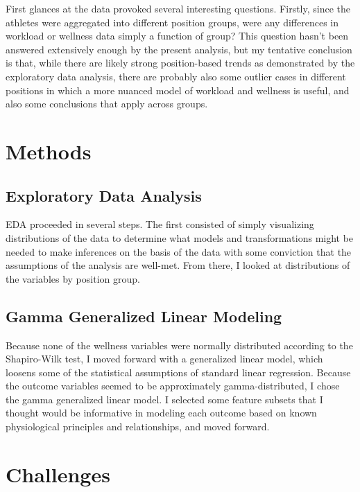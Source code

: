 \documentclass{article}
\begin{document}
		First glances at the data provoked several interesting questions. Firstly,
		since the athletes were aggregated into different position groups, were
		any differences in workload or wellness data simply a function of group?
		This question hasn't been answered extensively enough by the present
		analysis, but my tentative conclusion is that, while there are likely strong
		position-based trends as demonstrated by the exploratory data analysis,
		there are probably also some outlier cases in different positions in which
		a more nuanced model of workload and wellness is useful, and also some
		conclusions that apply across groups.

	\section{Methods}

		\subsection{Exploratory Data Analysis}

			EDA proceeded in several steps. The first consisted of simply visualizing
			distributions of the data to determine what models and transformations
			might be needed to make inferences on the basis of the data with some
			conviction that the assumptions of the analysis are well-met. From there,
			I looked at distributions of the variables by position group.

		\subsection{Gamma Generalized Linear Modeling}

			Because none of the wellness variables were normally distributed according
			to the Shapiro-Wilk test, I moved forward with a generalized linear model,
			which loosens some of the statistical assumptions of standard linear
			regression. Because the outcome variables seemed to be approximately
			gamma-distributed, I chose the gamma generalized linear model. I selected
			some feature subsets that I thought would be informative in modeling
			each outcome based on known physiological principles and relationships,
			and moved forward.

	\section{Challenges}
\end{document}
